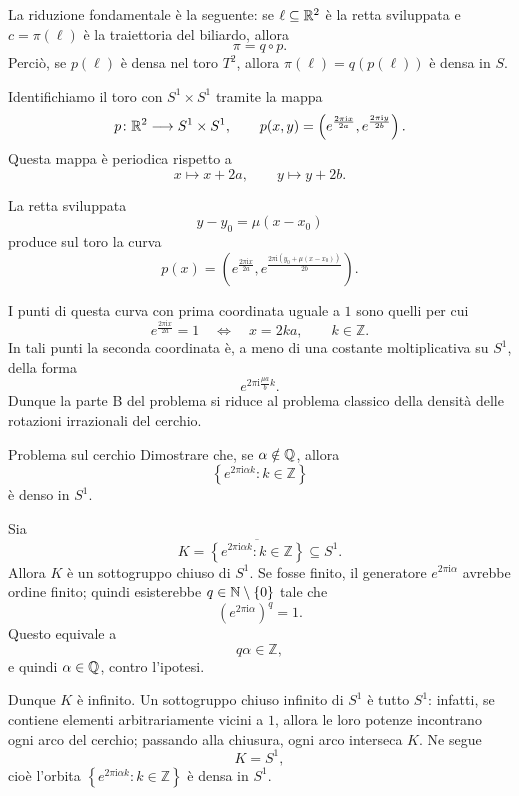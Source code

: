 \documentclass[a4paper]{article}
\begin{document}

La riduzione fondamentale è la seguente: se \(\ell\subseteq \mathbb{R}^2\) è la retta sviluppata e \(c=\pi(\ell)\) è la traiettoria del biliardo, allora
\[
    \pi=q\circ p.
\]
Perciò, se \(p(\ell)\) è densa nel toro \(T^2\), allora \(\pi(\ell)=q(p(\ell))\) è densa in \(S\).

Identifichiamo il toro con \(S^1\times S^1\) tramite la mappa
\[
    p\colon \mathbb{R}^2\longrightarrow S^1\times S^1,
    \qquad
    p(x,y)=
    \left(
        e^{\frac{2\pi \mathrm{i}x}{2a}},
        e^{\frac{2\pi \mathrm{i}y}{2b}}
    \right).
\]
Questa mappa è periodica rispetto a
\[
    x\mapsto x+2a,
    \qquad
    y\mapsto y+2b.
\]

La retta sviluppata
\[
    y-y_0=\mu(x-x_0)
\]
produce sul toro la curva
\[
    p(x)
    =
    \left(
        e^{\frac{2\pi \mathrm{i}x}{2a}},
        e^{\frac{2\pi \mathrm{i}\left(y_0+\mu(x-x_0)\right)}{2b}}
    \right).
\]

I punti di questa curva con prima coordinata uguale a \(1\) sono quelli per cui
\[
    e^{\frac{2\pi \mathrm{i}x}{2a}}=1
    \quad\Longleftrightarrow\quad
    x=2ka,
    \qquad k\in \mathbb{Z}.
\]
In tali punti la seconda coordinata è, a meno di una costante moltiplicativa su \(S^1\), della forma
\[
    e^{2\pi \mathrm{i}\frac{\mu a}{b}k}.
\]
Dunque la parte B del problema si riduce al problema classico della densità delle rotazioni irrazionali del cerchio.

\begin{snippetexercise}{Problema sul cerchio}
Dimostrare che, se \(\alpha\notin \mathbb{Q}\), allora
\[
    \left\{e^{2\pi \mathrm{i}\alpha k}:k\in\mathbb{Z}\right\}
\]
è denso in \(S^1\).
\end{snippetexercise}

\begin{snippetsolution}{}
Sia
\[
    K=\overline{\left\{e^{2\pi \mathrm{i}\alpha k}:k\in\mathbb{Z}\right\}}
    \subseteq S^1.
\]
Allora \(K\) è un sottogruppo chiuso di \(S^1\). Se fosse finito, il generatore \(e^{2\pi \mathrm{i}\alpha}\) avrebbe ordine finito; quindi esisterebbe \(q\in\mathbb{N}\setminus\{0\}\) tale che
\[
    \left(e^{2\pi \mathrm{i}\alpha}\right)^q=1.
\]
Questo equivale a
\[
    q\alpha\in\mathbb{Z},
\]
e quindi \(\alpha\in\mathbb{Q}\), contro l'ipotesi.

Dunque \(K\) è infinito. Un sottogruppo chiuso infinito di \(S^1\) è tutto \(S^1\): infatti, se contiene elementi arbitrariamente vicini a \(1\), allora le loro potenze incontrano ogni arco del cerchio; passando alla chiusura, ogni arco interseca \(K\). Ne segue
\[
    K=S^1,
\]
cioè l'orbita \(\left\{e^{2\pi \mathrm{i}\alpha k}:k\in\mathbb{Z}\right\}\) è densa in \(S^1\).
\end{snippetsolution}
\end{document}
